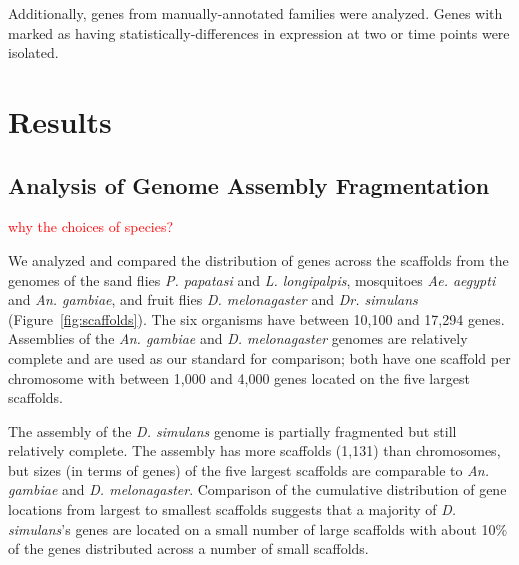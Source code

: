 Additionally, genes from manually-annotated families were analyzed.  Genes with marked as having statistically-differences in expression at two or time points were isolated.

\section{Results}

\subsection{Analysis of Genome Assembly Fragmentation}

\textcolor{red}{why the choices of species?}

We analyzed and compared the distribution of genes across the scaffolds from the genomes of the sand flies \emph{P. papatasi} and \emph{L. longipalpis}, mosquitoes \emph{Ae. aegypti} and \emph{An. gambiae}, and fruit flies \emph{D. melonagaster} and \emph{Dr. simulans} (Figure~\ref{fig:scaffolds}).  The six organisms have between 10,100 and 17,294 genes.  Assemblies of the \emph{An. gambiae} and \emph{D. melonagaster} genomes are relatively complete and are used as our standard for comparison; both have one scaffold per chromosome with between 1,000 and 4,000 genes located on the five largest scaffolds.

The assembly of the \emph{D. simulans} genome is partially fragmented but still relatively complete.  The assembly has more scaffolds (1,131) than chromosomes, but sizes (in terms of genes) of the five largest scaffolds are comparable to \emph{An. gambiae} and \emph{D. melonagaster}.  Comparison of the cumulative distribution of gene locations from largest to smallest scaffolds suggests that a majority of \emph{D. simulans}'s genes are located on a small number of large scaffolds with about 10\% of the genes distributed across a number of small scaffolds.

